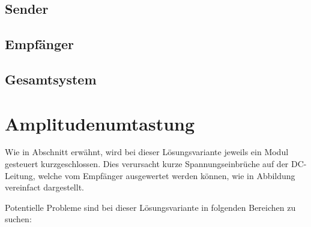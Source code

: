 \subsection{Sender}
\label{sec:simu:fsk:inductive:transmitter}

\subsection{Empf\"anger}
\label{sec:simu:fsk:inductive:receiver}

\subsection{Gesamtsystem}
\label{sec:simu:fsk:inductive:inductive}


\section{Amplitudenumtastung}
\label{sec:simu:ask}

Wie in Abschnitt  erw\"ahnt, wird bei dieser L\"osungsvariante
jeweils   ein   Modul   gesteuert   kurzgeschlossen. Dies   verursacht   kurze
Spannungseinbr\"uche auf  der DC-Leitung,  welche vom  Empf\"anger ausgewertet
werden k\"onnen, wie in Abbildung vereinfact dargestellt.

Potentielle Probleme sind bei  dieser L\"osungsvariante in folgenden Bereichen
zu suchen:

